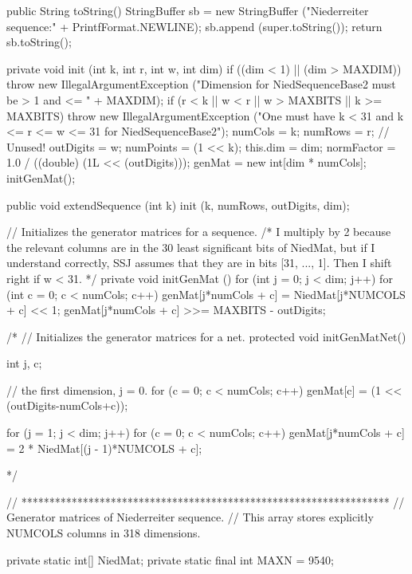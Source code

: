 \begin{code}\begin{hide}

   public String toString() {
      StringBuffer sb = new StringBuffer ("Niederreiter sequence:" +
                                           PrintfFormat.NEWLINE);
      sb.append (super.toString());
      return sb.toString();
   }

   private void init (int k, int r, int w, int dim) {
      if ((dim < 1) || (dim > MAXDIM))
         throw new IllegalArgumentException 
            ("Dimension for NiedSequenceBase2 must be > 1 and <= " + MAXDIM);
      if (r < k || w < r || w > MAXBITS || k >= MAXBITS) 
         throw new IllegalArgumentException
            ("One must have k < 31 and k <= r <= w <= 31 for NiedSequenceBase2");
      numCols   = k;
      numRows   = r;   // Unused!
      outDigits = w;
      numPoints = (1 << k);
      this.dim  = dim;
      normFactor = 1.0 / ((double) (1L << (outDigits)));
      genMat = new int[dim * numCols];
      initGenMat();
   }


   public void extendSequence (int k) {
      init (k, numRows, outDigits, dim);
   }


   // Initializes the generator matrices for a sequence. 
   /* I multiply by 2 because the relevant columns are in the 30 least 
      significant bits of NiedMat, but if I understand correctly,
      SSJ assumes that they are in bits [31, ..., 1]. 
      Then I shift right if w < 31. */
   private void initGenMat ()  {
      for (int j = 0; j < dim; j++)
         for (int c = 0; c < numCols; c++) {
            genMat[j*numCols + c] = NiedMat[j*NUMCOLS + c] << 1;
            genMat[j*numCols + c] >>= MAXBITS - outDigits;
         }
   }

/*
   // Initializes the generator matrices for a net. 
   protected void initGenMatNet()  {
      int j, c;

      // the first dimension, j = 0.
      for (c = 0; c < numCols; c++)
         genMat[c] = (1 << (outDigits-numCols+c));

      for (j = 1; j < dim; j++)
         for (c = 0; c < numCols; c++)
            genMat[j*numCols + c] = 2 * NiedMat[(j - 1)*NUMCOLS + c];
   }
*/

   // ****************************************************************** 
   // Generator matrices of Niederreiter sequence. 
   // This array stores explicitly NUMCOLS columns in 318 dimensions.

   private static int[] NiedMat;
   private static final int MAXN = 9540;


\end{hide}
\end{code}
